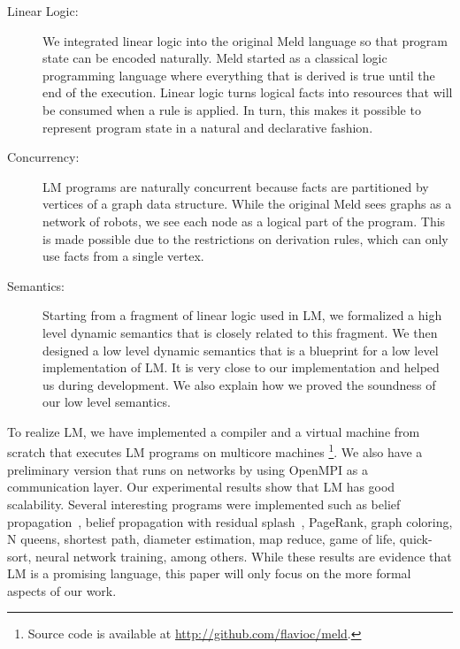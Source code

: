 \begin{description}
   \item[Linear Logic:] We integrated linear logic into the original Meld language so that program state can be encoded naturally.
   Meld started as a classical logic programming language where everything that is derived is true until the end
   of the execution. Linear logic turns logical facts into resources that will be consumed when a rule is applied. In turn, this makes it possible to represent program state in a natural and declarative fashion.
   \item[Concurrency:] LM programs are naturally concurrent because facts are partitioned by vertices of a graph data structure. While the original Meld sees graphs as a network of robots, we see each node as a logical part of the program. This is made possible due to the restrictions on derivation rules, which can only use facts from a single vertex.
   \item[Semantics:] Starting from a fragment of linear logic used in LM, we formalized a high level dynamic semantics that is closely related to this fragment.
   We then designed a low level dynamic semantics that is a blueprint for a low level implementation of LM. It is very
   close to our implementation and helped us during development. We also explain how we proved the soundness of our low level semantics.
\end{description}

To realize LM, we have implemented a compiler and a virtual machine from scratch that executes LM programs on multicore machines
\footnote{Source code is available at \url{http://github.com/flavioc/meld}.}. We also have a preliminary version that runs on networks by
using OpenMPI as a communication layer. Our experimental results show that LM has good scalability.
Several interesting programs were implemented such as belief propagation~\cite{Gonzalez+al:aistats09paraml},
belief propagation with residual splash~\cite{Gonzalez+al:aistats09paraml}, PageRank, graph coloring,
N queens, shortest path, diameter estimation, map reduce, game of life, quick-sort, neural network training, among others.
While these results are evidence that LM is a promising language, this paper will only focus on the more formal aspects of our work.
